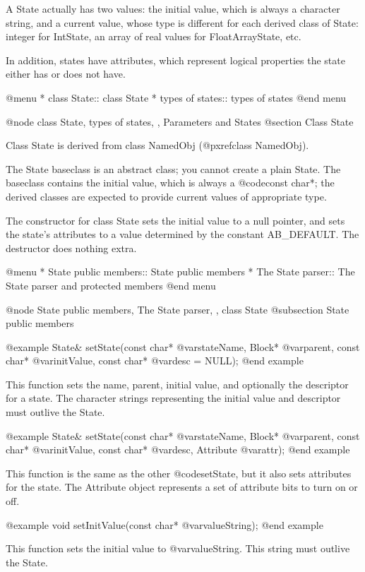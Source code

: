A State actually has two values: the initial value, which is always
a character string, and a current value, whose type is different for
each derived class of State: integer for IntState, an array of real
values for FloatArrayState, etc.

In addition, states have attributes, which represent logical properties
the state either has or does not have.

@menu
* class State::     class State
* types of states::  types of states
@end menu

@node class State, types of states,  , Parameters and States
@section Class State

Class State is derived from class NamedObj (@pxref{class NamedObj}).

The State baseclass is an abstract class; you cannot create a plain
State.  The baseclass contains the initial value, which is always
a @code{const char*}; the derived classes are expected to provide
current values of appropriate type.

The constructor for class State sets the initial value to a null
pointer, and sets the state's attributes to a value determined by
the constant AB_DEFAULT.  The destructor does nothing extra.

@menu
* State public members::  State public members
* The State parser::  The State parser and protected members
@end menu

@node State public members, The State parser,  , class State
@subsection State public members

@example
State& setState(const char* @var{stateName}, Block* @var{parent},
               const char* @var{initValue}, const char* @var{desc} = NULL);
@end example

This function sets the name, parent, initial value, and optionally the
descriptor for a state.  The character strings representing the initial
value and descriptor must outlive the State.

@example
State& setState(const char* @var{stateName}, Block* @var{parent},
               const char* @var{initValue}, const char* @var{desc},
               Attribute @var{attr});
@end example

This function is the same as the other @code{setState}, but it also
sets attributes for the state.  The Attribute object represents a
set of attribute bits to turn on or off.

@example
void setInitValue(const char* @var{valueString});
@end example

This function sets the initial value to @var{valueString}.  This
string must outlive the State.

